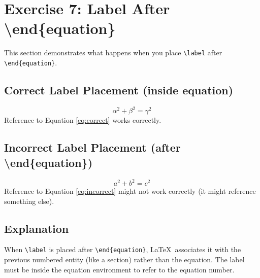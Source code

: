 \documentclass[12pt]{article}
\begin{document}
\newpage
\section{Exercise 7: Label After \textbackslash end\{equation\}}
\label{sec:exercise7}

This section demonstrates what happens when you place \texttt{\textbackslash label} after \texttt{\textbackslash end\{equation\}}.

\subsection{Correct Label Placement (inside equation)}
\begin{equation}
    \alpha^2 + \beta^2 = \gamma^2 \label{eq:correct}
\end{equation}
Reference to Equation \ref{eq:correct} works correctly.

\subsection{Incorrect Label Placement (after \textbackslash end\{equation\})}
\begin{equation}
    a^2 + b^2 = c^2
\end{equation}
\label{eq:incorrect}
Reference to Equation \ref{eq:incorrect} might not work correctly (it might reference something else).

\subsection{Explanation}
When \texttt{\textbackslash label} is placed after \texttt{\textbackslash end\{equation\}}, \LaTeX\ associates it with the previous numbered entity (like a section) rather than the equation. The label must be inside the equation environment to refer to the equation number.
\end{document}
